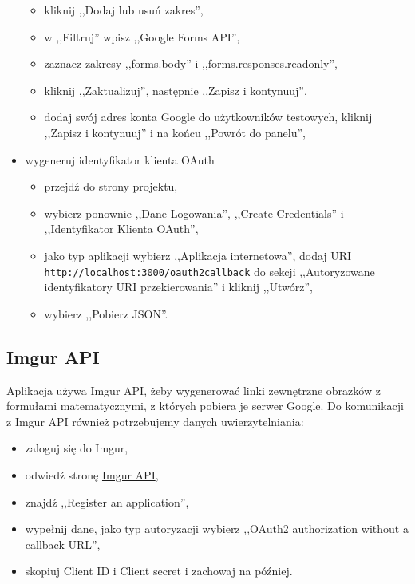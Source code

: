\begin{itemize}
\begin{itemize}
      \item kliknij ,,Dodaj lub usuń zakres'',
      \item w ,,Filtruj'' wpisz ,,Google Forms API'',
      \item zaznacz zakresy ,,forms.body'' i ,,forms.responses.readonly'',
      \item kliknij ,,Zaktualizuj'', następnie ,,Zapisz i kontynuuj'',
      \item dodaj swój adres konta Google do użytkowników testowych, kliknij
      ,,Zapisz i kontynuuj'' i na końcu ,,Powrót do panelu'',
    \end{itemize}
  \item wygeneruj identyfikator klienta OAuth
    \begin{itemize}
      \item przejdź do strony projektu,
      \item wybierz ponownie ,,Dane Logowania'', ,,Create Credentials''
            i ,,Identyfikator Klienta OAuth'',
      \item jako typ aplikacji wybierz ,,Aplikacja internetowa'', dodaj URI 
            \\ \texttt{http://localhost:3000/oauth2callback} do sekcji ,,Autoryzowane 
            identyfikatory URI przekierowania'' i kliknij ,,Utwórz'',
      \item wybierz ,,Pobierz JSON''.
    \end{itemize}
\end{itemize}

\subsection{Imgur API}
Aplikacja używa Imgur API, żeby wygenerować linki zewnętrzne obrazków
z formułami matematycznymi, z których pobiera je serwer Google. Do komunikacji
z Imgur API również potrzebujemy danych uwierzytelniania:
\begin{itemize}
  \item zaloguj się do Imgur,
  \item odwiedź stronę \href{https://api.imgur.com/}{Imgur API},
  \item znajdź ,,Register an application'',
  \item wypełnij dane, jako typ autoryzacji wybierz ,,OAuth2 authorization without
  a callback URL'',
  \item skopiuj Client ID i Client secret i zachowaj na później.
\end{itemize}

